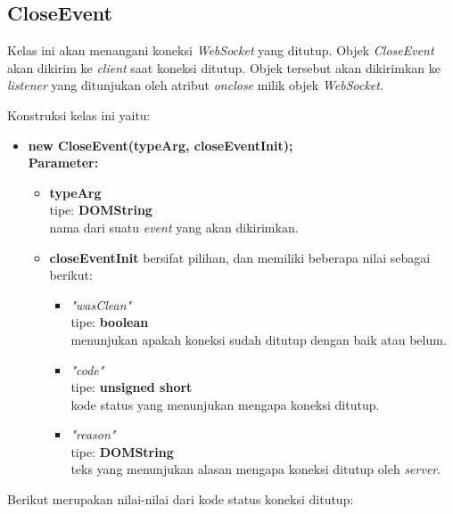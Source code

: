 \subsection{CloseEvent}
Kelas ini akan menangani koneksi \textit{WebSocket} yang ditutup. Objek \textit{CloseEvent} akan dikirim ke \textit{client} saat koneksi ditutup. Objek tersebut akan dikirimkan ke \textit{listener} yang ditunjukan oleh atribut \textit{onclose} milik objek \textit{WebSocket}.

Konstruksi kelas ini yaitu:

\begin{itemize}
	\item \textbf{new CloseEvent(typeArg, closeEventInit);} \\ \textbf{Parameter:} 
		\begin{itemize}
			\item \textbf{typeArg} \\ tipe: \textbf{DOMString} \\ nama dari suatu \textit{event} yang akan dikirimkan.
			\item \textbf{closeEventInit} bersifat pilihan, dan memiliki beberapa nilai sebagai berikut:
				\begin{itemize}
					\item \textit{"wasClean"} \\ tipe: \textbf{boolean} \\ menunjukan apakah koneksi sudah ditutup dengan baik atau belum.
					\item \textit{"code"} \\ tipe: \textbf{unsigned short} \\ kode status yang menunjukan mengapa koneksi ditutup.
					\item \textit{"reason"} \\ tipe: \textbf{DOMString} \\ teks yang menunjukan alasan mengapa koneksi ditutup oleh \textit{server}.
				\end{itemize}
		\end{itemize}
\end{itemize}

Berikut merupakan nilai-nilai dari kode status koneksi ditutup:

